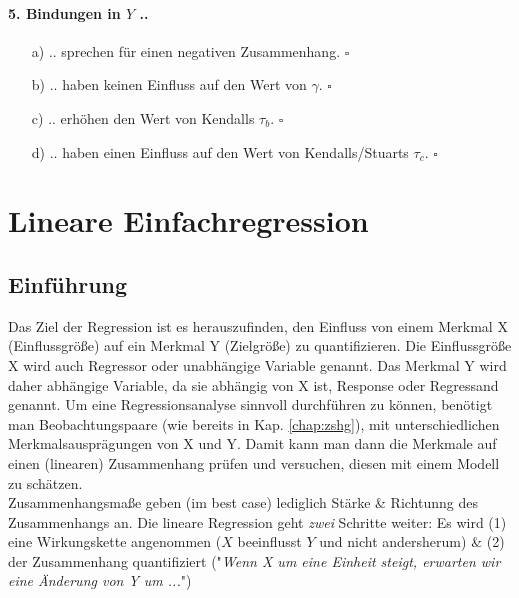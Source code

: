 \documentclass[a4paper]{article}
\newcommand\dangersign[1][2ex]{%
  \renewcommand\stacktype{L}%
  \scaleto{\stackon[1.3pt]{\color{red}$\triangle$}{\tiny !}}{#1}%
}
\begin{document}
\paragraph{5. Bindungen in $Y$ ..}

\begin{itemize}
    \item[a)] .. sprechen für einen negativen Zusammenhang. \hfill $\square$
    \item[b)] .. haben keinen Einfluss auf den Wert von $\gamma$. \hfill $\square$
    \item[c)] .. erhöhen den Wert von Kendalls $\tau_b$. \hfill $\square$
    \item[d)] .. haben einen Einfluss auf den Wert von Kendalls/Stuarts $\tau_c$. \hfill $\square$
\end{itemize}


\clearpage


\section{Lineare Einfachregression}\label{chap:linreg}
\subsection{Einführung}
Das Ziel der Regression ist es herauszufinden, den Einfluss von einem Merkmal X (Einflussgröße) auf ein Merkmal Y (Zielgröße) zu quantifizieren. Die Einflussgröße X wird auch Regressor oder unabhängige Variable genannt. Das Merkmal Y wird daher abhängige Variable, da sie abhängig von X ist, Response oder Regressand genannt. Um eine Regressionsanalyse sinnvoll durchführen zu können, benötigt man Beobachtungspaare (wie bereits in Kap. \ref{chap:zshg}), mit unterschiedlichen Merkmalsausprägungen von X und Y. Damit kann man dann die Merkmale auf einen (linearen) Zusammenhang prüfen und versuchen, diesen mit einem Modell zu schätzen.\\

\noindent \dangersign[3ex] Zusammenhangsmaße geben (im best case) lediglich Stärke \& Richtunng des Zusammenhangs an. Die lineare Regression geht \textit{zwei} Schritte weiter: Es wird (1) eine Wirkungskette angenommen ($X$ beeinflusst $Y$ und nicht andersherum) \& (2) der Zusammenhang quantifiziert ("\textit{Wenn X um eine Einheit steigt, erwarten wir eine Änderung von Y um ...}")\\
\end{document}
